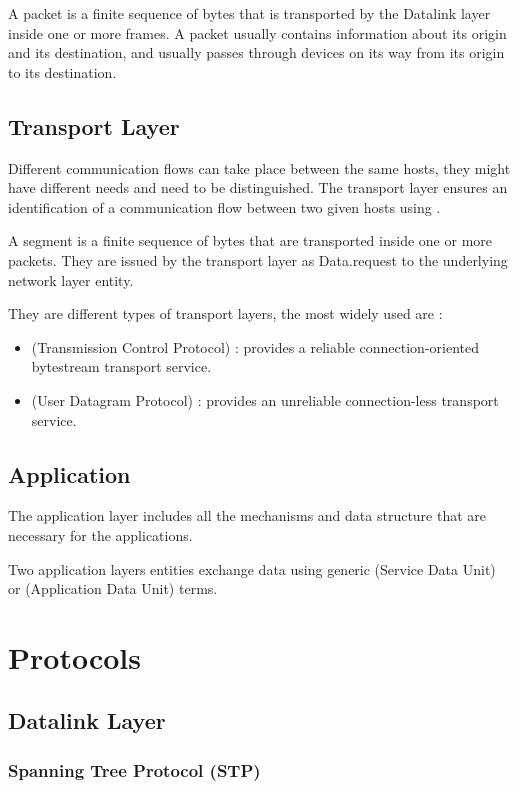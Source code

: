 A packet is a finite sequence of bytes that is transported by the Datalink layer inside one or more frames. A packet usually contains information about its origin and its destination, and usually passes through devices on its way from its origin to its destination.

\section{Transport Layer}

Different communication flows can take place between the same hosts, they might have different needs and need to be distinguished. The transport layer ensures an identification of a communication flow between two given hosts using .

A segment is a finite sequence of bytes that are transported inside one or more packets. They are issued by the transport layer as Data.request to the underlying network layer entity.

They are different types of transport layers, the most widely used are :
\begin{itemize}
\item {} (Transmission Control Protocol) : provides a reliable connection-oriented bytestream transport service.
\item {} (User Datagram Protocol) : provides an unreliable connection-less transport service.
\end{itemize}

\section{Application}

The application layer includes all the mechanisms and data structure that are necessary for the applications.

Two application layers entities exchange data using generic  (Service Data Unit) or  (Application Data Unit) terms.

\chapter{Protocols}

\section{Datalink Layer}

\subsection[STP]{Spanning Tree Protocol (STP)}

